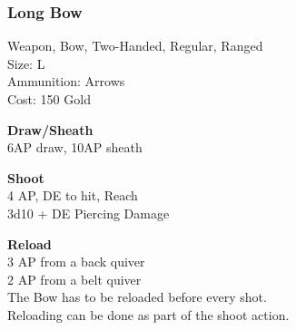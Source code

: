 \subsubsection{Long Bow}\label{weapon:longBow}
Weapon, Bow, Two-Handed, Regular, Ranged\\
Size: L\\
Ammunition: Arrows\\
Cost: 150 Gold

\textbf{Draw/Sheath}\\
6AP draw, 10AP sheath

\textbf{Shoot}\\
4 AP, DE to hit,  Reach\\
3d10 + \texttimes DE Piercing Damage

\textbf{Reload}\\
3 AP from a back quiver\\
2 AP from a belt quiver\\
The Bow has to be reloaded before every shot.\\
Reloading can be done as part of the shoot action.